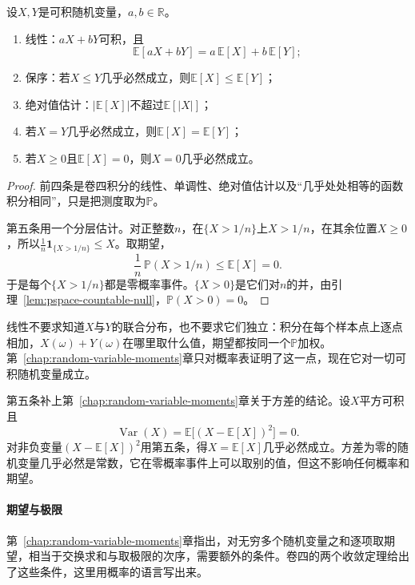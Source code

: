 \begin{theorem}[期望的基本性质]
\label{thm:pspace-expectation-properties}
设$X,Y$是可积随机变量，$a,b\in\mathbb{R}$。
\begin{enumerate}
  \item 线性：$aX+bY$可积，且
  \begin{equation}
    \mathbb{E}[aX+bY]=a\,\mathbb{E}[X]+b\,\mathbb{E}[Y];
    \label{eq:pspace-linearity}
  \end{equation}
  \item 保序：若$X\leq Y$几乎必然成立，则$\mathbb{E}[X]\leq\mathbb{E}[Y]$；
  \item 绝对值估计：$\lvert\mathbb{E}[X]\rvert$不超过$\mathbb{E}[\lvert X\rvert]$；
  \item 若$X=Y$几乎必然成立，则$\mathbb{E}[X]=\mathbb{E}[Y]$；
  \item 若$X\geq0$且$\mathbb{E}[X]=0$，则$X=0$几乎必然成立。
\end{enumerate}
\end{theorem}

\begin{proof}
前四条是卷四积分的线性、单调性、绝对值估计以及“几乎处处相等的函数积分相同”，只是把测度取为$\mathbb{P}$。

第五条用一个分层估计。对正整数$n$，在$\{X>1/n\}$上$X>1/n$，在其余位置$X\geq0$，所以$\frac1n\mathbf{1}_{\{X>1/n\}}\leq X$。取期望，
\[
  \frac1n\,\mathbb{P}(X>1/n)\leq\mathbb{E}[X]=0 .
\]
于是每个$\{X>1/n\}$都是零概率事件。$\{X>0\}$是它们对$n$的并，由引理~\ref{lem:pspace-countable-null}，$\mathbb{P}(X>0)=0$。
\end{proof}

线性不要求知道$X$与$Y$的联合分布，也不要求它们独立：积分在每个样本点上逐点相加，$X(\omega)+Y(\omega)$在哪里取什么值，期望都按同一个$\mathbb{P}$加权。第~\ref{chap:random-variable-moments}章只对概率表证明了这一点，现在它对一切可积随机变量成立。

第五条补上第~\ref{chap:random-variable-moments}章关于方差的结论。设$X$平方可积且
\[
  \operatorname{Var}(X)=\mathbb{E}\bigl[(X-\mathbb{E}[X])^{2}\bigr]=0 .
\]
对非负变量$(X-\mathbb{E}[X])^{2}$用第五条，得$X=\mathbb{E}[X]$几乎必然成立。方差为零的随机变量几乎必然是常数，它在零概率事件上可以取别的值，但这不影响任何概率和期望。

\paragraph{期望与极限}
第~\ref{chap:random-variable-moments}章指出，对无穷多个随机变量之和逐项取期望，相当于交换求和与取极限的次序，需要额外的条件。卷四的两个收敛定理给出了这些条件，这里用概率的语言写出来。

